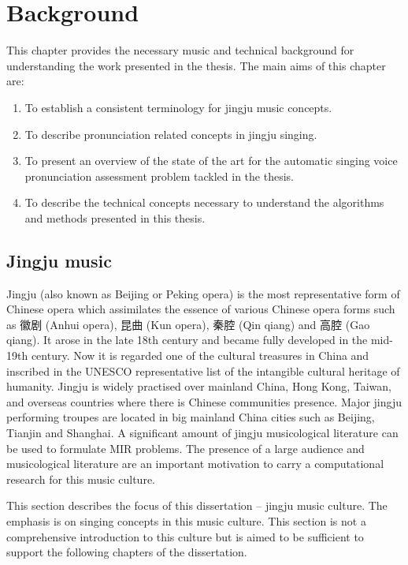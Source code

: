 \chapter{Background}\label{chap:bkgnd}

This chapter provides the necessary music and technical background for understanding the work presented in the thesis. The main aims of this chapter are:

\begin{enumerate}[leftmargin=*]
\item To establish a consistent terminology for jingju music concepts.
\item To describe pronunciation related concepts in jingju singing.
\item To present an overview of the state of the art for the automatic singing voice pronunciation assessment problem tackled in the thesis.
\item To describe the technical concepts necessary to understand the algorithms and methods presented in this thesis.
\end{enumerate}

\section{Jingju music}\label{sec:ch2:jingju_music}
Jingju (also known as Beijing or Peking opera) is the most representative form of Chinese opera which assimilates the essence of various Chinese opera forms such as 徽剧 (Anhui opera), 昆曲 (Kun opera), 秦腔 (Qin qiang) and 高腔 (Gao qiang). It arose in the late 18th century and became fully developed in the mid-19th century. Now it is regarded one of the cultural treasures in China and inscribed in the UNESCO representative list of the intangible cultural heritage of humanity. Jingju is widely practised over mainland China, Hong Kong, Taiwan, and overseas countries where there is Chinese communities presence. Major jingju performing troupes are located in big mainland China cities such as Beijing, Tianjin and Shanghai. A significant amount of jingju musicological literature can be used to formulate \gls{MIR} problems. The presence of a large audience and musicological literature are an important motivation to carry a computational research for this music culture.

This section describes the focus of this dissertation -- jingju music culture. The emphasis is on singing concepts in this music culture. This section is not a comprehensive introduction to this culture but is aimed to be sufficient to support the following chapters of the dissertation.

